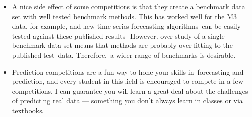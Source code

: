 \documentclass[11pt,a4paper,]{article}
\begin{document}
\begin{itemize}
\item
  A nice side effect of some competitions is that they create a benchmark data set with well tested benchmark methods. This has worked well for the M3 data, for example, and new time series forecasting algorithms~can be easily tested against these published results.~However, over-study of a single benchmark data set means that methods are probably over-fitting to the published test~data. Therefore,~a wider range of benchmarks is desirable.
\item
  Prediction competitions are a fun way to hone your skills in~forecasting and prediction, and every student in this field is encouraged to compete in a few competitions. I can guarantee you will learn a great deal about the challenges of predicting real data --- something you don't always learn in classes or via textbooks.
\end{itemize}

\printbibliography
\end{document}
